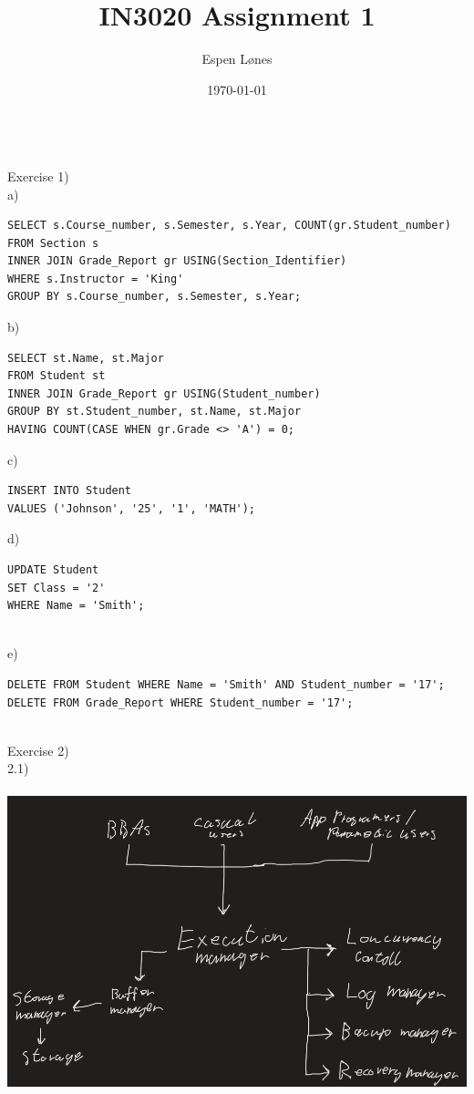 \documentclass[12pt, letterpaper, twoside]{article}
\begin{document}
\title{IN3020 Assignment 1}
\author{Espen Lønes}
\date{\today}
\maketitle
\ \\
Exercise 1)\\
a)
\begin{verbatim}
SELECT s.Course_number, s.Semester, s.Year, COUNT(gr.Student_number)
FROM Section s
INNER JOIN Grade_Report gr USING(Section_Identifier)
WHERE s.Instructor = 'King'
GROUP BY s.Course_number, s.Semester, s.Year;
\end{verbatim}
b)
\begin{verbatim}
SELECT st.Name, st.Major
FROM Student st
INNER JOIN Grade_Report gr USING(Student_number)
GROUP BY st.Student_number, st.Name, st.Major
HAVING COUNT(CASE WHEN gr.Grade <> 'A') = 0;
\end{verbatim}
c)
\begin{verbatim}
INSERT INTO Student
VALUES ('Johnson', '25', '1', 'MATH');
\end{verbatim}
d)
\begin{verbatim}
UPDATE Student
SET Class = '2'
WHERE Name = 'Smith';
\end{verbatim}
\newpage
\ \\
e)
\begin{verbatim}
DELETE FROM Student WHERE Name = 'Smith' AND Student_number = '17';
DELETE FROM Grade_Report WHERE Student_number = '17';
\end{verbatim}
\ \\
Exercise 2)\\
2.1)\\
\ \\
\includegraphics[scale=0.5]{"2_1.png"}\\
\end{document}

